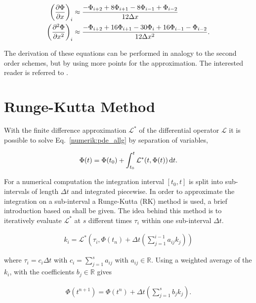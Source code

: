 \begin{align}
    \left(\pdn[\Phi]{x}\right)_i &\approx \frac{-\Phi_{i+2} + 8\Phi_{i+1} - 8\Phi_{i-1} + \Phi_{i-2}}{12\Delta x} \\
    \left(\pdn[^2\Phi]{x^2}\right)_i &\approx \frac{-\Phi_{i+2} + 16\Phi_{i+1} -30\Phi_i + 16\Phi_{i-1} - \Phi_{i-2}}{12\Delta x^2}.
    \label{num:fd_o4_methods}
\end{align}

The derivation of these equations can be performed in analogy to the second order schemes, but by using more points for the
approximation. The interested reader is referred to \citep{Fornberg1988}.

\newpage

\section{Runge-Kutta Method}
\label{numerik:rk_williamson_sec}

With the finite difference approximation $\mathcal{L^*}$ of the differential operator $\mathcal{L}$
it is possible to solve Eq.~\ref{numerik:pde_allg} by separation of variables,

\begin{align}
    \Phi(t) = \Phi(t_0) + \int_{t_0}^{t} \mathcal{L^*} (t, \Phi(t)) \mathop{}\!\mathrm{d} t.
\end{align}

For a numerical computation the integration interval $[t_0, t]$  is split into sub-intervals  of length $\Delta t$ and integrated piecewise.
In order to approximate the integration on a sub-interval a Runge-Kutta  (RK) method is used, a brief introduction based  on \citep{umwelt} shall be given.
The idea behind this method is to iteratively evaluate $\mathcal{L^*}$ at $s$ different times $\tau_i$ within one sub-interval $\Delta t$.

\begin{align}
 k_i = \mathcal{L^*} \left(\tau_i, \Phi(t_n) + \Delta t \left( \sum_{j=1}^{i-1}a_{ij} k_j \right)\right)
\end{align}

where $\tau_i=c_i \Delta t$ with $c_i =\sum_{j=1}^{s}a_{ij}$ with $a_{ij} \in \mathbb{R}$.
Using a  weighted average of the $k_i$, with the coefficients $b_j\in\mathbb{R}$ gives

\begin{align}
    \Phi(t^{n+1}) = \Phi(t^n) + \Delta t \left( \sum_{j=1}^s b_j k_j \right).
\end{align}

